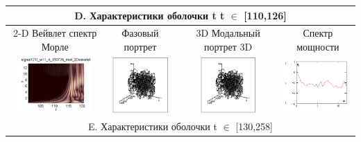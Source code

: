 \documentclass[12pt,letterpaper]{extreport}
\begin{document}
\begin{table}[H]
{\begin{tabular}{|c|c|c|c|}
\multicolumn{4}{|c|}{D. Характеристики оболочки t  t $
\in$ [110,126]}\\

\hline
\footnotesize 2-D Вейвлет спектр Морле&\footnotesize 
Фазовый портрет&\footnotesize 3D	Модальный портрет 
3D&\footnotesize Спектр мощности\\
\hline
	\includegraphics[height = 80px]{d1} 	
	&	
	\includegraphics[height = 80px]{d2} 	
	&	
	\includegraphics[height = 80px]{d3} 
	&
	\includegraphics[height = 80px]{d4} 
\\
\hline

\multicolumn{4}{|c|}{E. Характеристики оболочки  t $\in$ 
[130,258]}\\


\end{tabular}}
\end{table}
\end{document}
